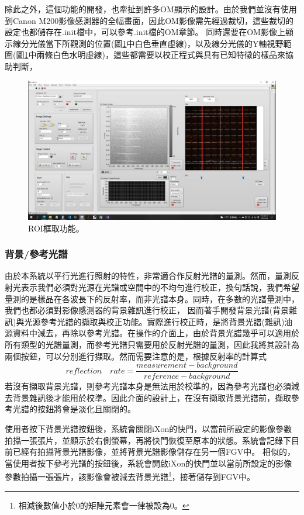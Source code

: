 \documentclass[12pt]{article}
\begin{document}
除此之外，這個功能的開發，也牽扯到許多OM顯示的設計。由於我們並沒有使用到Canon M200影像感測器的全幅畫面，因此OM影像需先經過裁切，這些裁切的設定也都儲存在.init檔中，可以參考.init檔的OM章節。
同時還要在OM影像上顯示線分光儀當下所觀測的位置(圖\ref{figure: roi}中白色垂直虛線)，以及線分光儀的Y軸視野範圍(圖\ref{figure: roi}中兩條白色水明虛線)，這些都需要以校正程式與具有已知特徵的樣品來協助判斷，
\begin{figure}
    \centering
    \includegraphics[width=\linewidth]{roi.jpeg}
    \caption{ROI框取功能。}
    \label{figure: roi}
\end{figure}

\subsubsection{背景/參考光譜}
由於本系統以平行光進行照射的特性，非常適合作反射光譜的量測。然而，量測反射光表示我們必須對光源在光譜或空間中的不均勻進行校正，換句話說，我們希望量測的是樣品在各波長下的反射率，而非光譜本身。同時，在多數的光譜量測中，我們也都必須對影像感測器的背景雜訊進行校正，
因而著手開發背景光譜(背景雜訊)與光源參考光譜的擷取與校正功能。實際進行校正時，是將背景光譜(雜訊)油源資料中減去，再除以參考光譜。在操作的介面上，由於背景光譜幾乎可以適用於所有類型的光譜量測，而參考光譜只需要用於反射光譜的量測，因此我將其設計為兩個按鈕，可以分別進行擷取。然而需要注意的是，根據反射率的計算式
\begin{equation}\label{equation: reflection}
    reflection \quad rate=\frac{measurement-background}{reference-background}
\end{equation}
若沒有擷取背景光譜，則參考光譜本身是無法用於校準的，因為參考光譜也必須減去背景雜訊後才能用於校準。因此介面的設計上，在沒有擷取背景光譜前，擷取參考光譜的按鈕將會是淡化且關閉的。

使用者按下背景光譜按鈕後，系統會關閉iXon的快門，以當前所設定的影像參數拍攝一張張片，並顯示於右側螢幕，再將快門恢復至原本的狀態。系統會記錄下目前已經有拍攝背景光譜影像，並將背景光譜影像儲存在另一個FGV中。
相似的，當使用者按下參考光譜的按鈕後，系統會開啟iXon的快門並以當前所設定的影像參數拍攝一張張片，該影像會被減去背景光譜\footnote{相減後數值小於0的矩陣元素會一律被設為0。}，接著儲存到FGV中。
\end{document}
